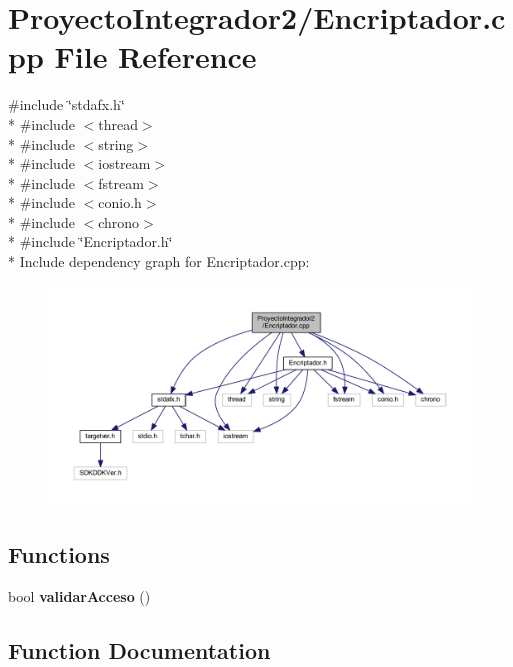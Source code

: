 \section{Proyecto\-Integrador2/\-Encriptador.cpp File Reference}
\label{_encriptador_8cpp}
{\ttfamily \#include \char`\"{}stdafx.\-h\char`\"{}}\\*
{\ttfamily \#include $<$thread$>$}\\*
{\ttfamily \#include $<$string$>$}\\*
{\ttfamily \#include $<$iostream$>$}\\*
{\ttfamily \#include $<$fstream$>$}\\*
{\ttfamily \#include $<$conio.\-h$>$}\\*
{\ttfamily \#include $<$chrono$>$}\\*
{\ttfamily \#include \char`\"{}Encriptador.\-h\char`\"{}}\\*
Include dependency graph for Encriptador.\-cpp\-:\nopagebreak
\begin{figure}[H]
\begin{center}
\leavevmode
\includegraphics[width=350pt]{_encriptador_8cpp__incl}
\end{center}
\end{figure}
\subsection*{Functions}
\begin{DoxyCompactItemize}
\item 
bool {\bf validar\-Acceso} ()
\end{DoxyCompactItemize}


\subsection{Function Documentation}
